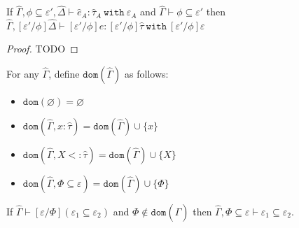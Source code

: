 \documentclass{llncs}
\newcommand{\keywadj}[1]{\mathtt{#1}}
\newcommand{\keyw}[1]{\keywadj{#1}~}
\newcommand{\kw}[1]{\keyw{ #1 }}
\newcommand{\kwa}[1]{\keywadj{ #1 }}
\begin{document}
\hrulefill

\begin{lemma}
If $\hat \Gamma, \phi \subseteq \varepsilon', \hat \Delta \vdash \hat e_A: \hat \tau_A~\kw{with} \varepsilon_A$ and $\hat \Gamma \vdash \phi \subseteq \varepsilon'$ then $\hat \Gamma, [\varepsilon'/\phi]\hat \Delta \vdash [\varepsilon'/\phi]e: [\varepsilon'/\phi]\hat \tau~\kw{with} [\varepsilon'/\phi]\varepsilon$
\end{lemma}

\begin{proof}
TODO
\end{proof}


\hrulefill

\begin{definition}[Domain]
For any $\hat \Gamma$, define $\kwa{dom}(\hat \Gamma)$ as follows:

\begin{itemize}
	\item $\kwa{dom}(\varnothing) = \varnothing$
	\item $\kwa{dom}(\hat \Gamma, x: \hat \tau) = \kwa{dom}(\hat \Gamma) \cup \{ x \}$
	\item $\kwa{dom}(\hat \Gamma, X <: \hat \tau) = \kwa{dom}(\hat \Gamma) \cup \{ X \}$
	\item $\kwa{dom}(\hat \Gamma, \Phi \subseteq \varepsilon) = \kwa{dom}(\hat \Gamma) \cup \{ \Phi \}$
\end{itemize}

\end{definition}


\hrulefill
 
\begin{lemma}
If $\hat \Gamma \vdash [\varepsilon/\Phi](\varepsilon_1 \subseteq \varepsilon_2)$ and $\Phi \notin \kwa{dom}(\hat \Gamma)$ then $\hat \Gamma, \Phi \subseteq \varepsilon \vdash \varepsilon_1 \subseteq \varepsilon_2$.
\end{lemma}
\end{document}
